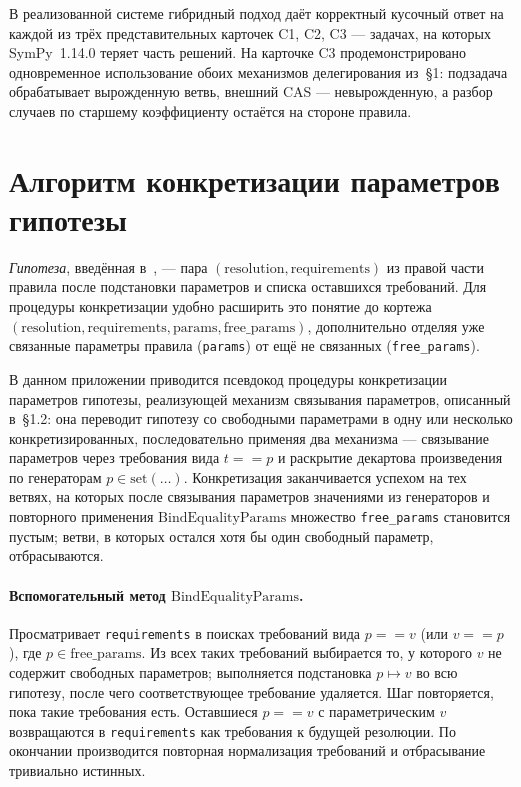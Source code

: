 \documentclass{intsys}
\begin{document}
В реализованной системе гибридный подход даёт корректный кусочный
ответ на каждой из трёх представительных карточек C1, C2, C3 ---
задачах, на которых SymPy~1.14.0 теряет часть решений. На карточке
C3 продемонстрировано одновременное использование обоих механизмов
делегирования из~\S1: подзадача обрабатывает вырожденную ветвь,
внешний CAS --- невырожденную, а разбор случаев по старшему
коэффициенту остаётся на стороне правила.

\appendix

\section{Алгоритм конкретизации параметров гипотезы}
\label{appendix:ground}

\emph{Гипотеза}, введённая в~\cite{IS-Annenkov2026}, --- пара
$(\mathrm{resolution}, \mathrm{requirements})$ из правой части
правила после подстановки параметров и списка оставшихся требований.
Для процедуры конкретизации удобно расширить это понятие до кортежа
$(\mathrm{resolution}, \mathrm{requirements}, \mathrm{params},
\mathrm{free\_params})$, дополнительно отделяя уже связанные параметры
правила (\texttt{params}) от ещё не связанных
(\texttt{free\_params}).

В данном приложении приводится псевдокод процедуры конкретизации
параметров гипотезы, реализующей механизм связывания параметров,
описанный в~\S1.2: она переводит гипотезу со свободными параметрами
в одну или несколько конкретизированных, последовательно применяя
два механизма --- связывание параметров через требования вида
$t == p$ и раскрытие декартова произведения по генераторам
$p \in \mathrm{set}(\ldots)$. Конкретизация заканчивается успехом на
тех ветвях, на которых после связывания параметров значениями из
генераторов и повторного применения $\mathrm{BindEqualityParams}$
множество \texttt{free\_params} становится пустым; ветви, в которых
остался хотя бы один свободный параметр, отбрасываются.

\paragraph{Вспомогательный метод $\mathrm{BindEqualityParams}$.} Просматривает
\texttt{requirements} в поисках требований вида $p == v$ (или
$v == p$), где $p \in \mathrm{free\_params}$. Из всех таких
требований выбирается то, у которого $v$ не содержит свободных
параметров; выполняется подстановка $p \mapsto v$ во всю гипотезу,
после чего соответствующее требование удаляется. Шаг повторяется,
пока такие требования есть. Оставшиеся $p == v$ с параметрическим
$v$ возвращаются в \texttt{requirements} как требования к будущей
резолюции. По окончании производится повторная нормализация
требований и отбрасывание тривиально истинных.
\end{document}
